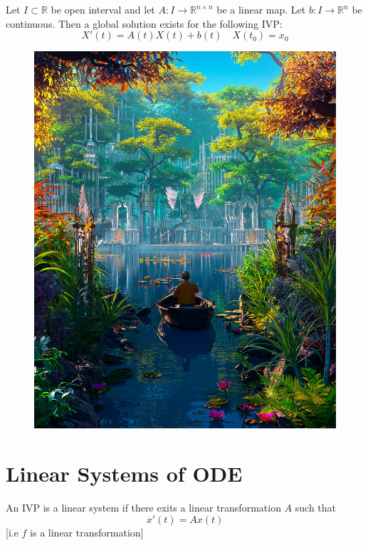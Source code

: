 \documentclass{tufte-book}
\begin{document}
\begin{tcolorbox}[colback=green!8!white]
	Let $I\subset\mathbb R$ be open interval and let $A:I\to \mathbb{R}^{n\times n}$ be a linear map. Let $b:I\to\mathbb R^n$  be continuous. Then a global solution exists for the following IVP:
	$$X'(t)=A(t)X(t)+b(t)\quad X(t_0)=x_0$$ 
\end{tcolorbox}
\begin{figure}
	\includegraphics[width=\textwidth]{1-1.jpg}
\end{figure}

\chapter{Linear Systems of ODE}
An IVP is a linear system if there exits a linear transformation $A$ such that 
$$x'(t)=Ax(t)$$
[i.e $f$ is a linear transformation]
\end{document}
